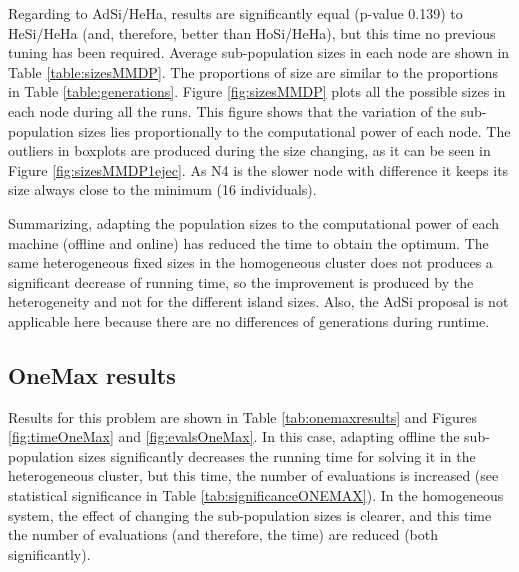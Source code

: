 \documentclass[final,1p,times]{elsarticle}
\begin{document}
Regarding to AdSi/HeHa, results are significantly  equal (p-value 0.139) to HeSi/HeHa (and, therefore, better than HoSi/HeHa), but this time no previous tuning has been required.  Average sub-population sizes in each node are shown in Table \ref{table:sizesMMDP}. The proportions of size are similar to the proportions in Table \ref{table:generations}. Figure \ref{fig:sizesMMDP} plots all the possible sizes in each node during all the runs. This figure shows that the variation of the sub-population sizes lies proportionally to the computational power of each node. The outliers in boxplots are produced during the size changing, as it can be seen in Figure \ref{fig:sizesMMDP1ejec}. As N4 is the slower node with difference it keeps its size always close to the minimum (16 individuals).


\begin{table}
\end{table}

Summarizing, adapting the population sizes to the
  computational power of each machine (offline and online) has reduced
  the time to obtain the optimum. The same heterogeneous fixed sizes
  in the homogeneous cluster does not produces a significant decrease
  of running time, so the improvement is produced by the heterogeneity
  and not for the different island sizes. Also, the AdSi proposal is
  not applicable here because there are no differences of generations
  during runtime.



\subsection{OneMax results}

Results for this problem are shown in Table \ref{tab:onemaxresults} and Figures  \ref{fig:timeOneMax} and \ref{fig:evalsOneMax}. In this case, adapting offline the sub-population sizes significantly decreases  the running time for solving it in the heterogeneous cluster, but this time, the number of evaluations is increased (see statistical significance in Table \ref{tab:significanceONEMAX}). In the homogeneous system, the effect of changing the sub-population sizes is clearer, and this time the number of evaluations (and therefore, the time) are reduced (both significantly). 
\end{document}
